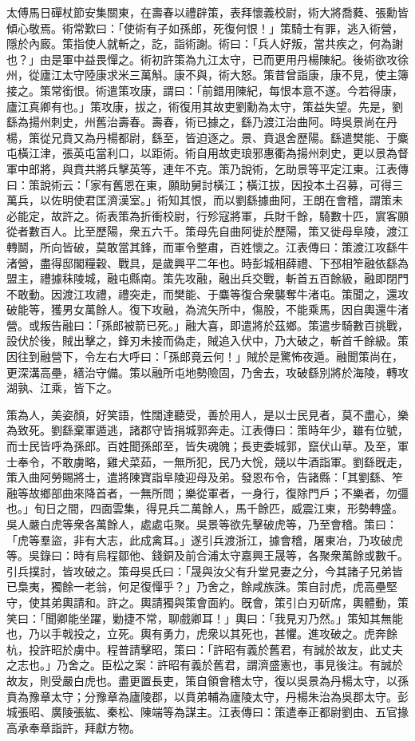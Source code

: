 \begin{pinyinscope}
太傅馬日磾杖節安集關東，在壽春以禮辟策，表拜懷義校尉，術大將喬蕤、張勳皆傾心敬焉。術常歎曰：「使術有子如孫郎，死復何恨！」策騎士有罪，逃入術營，隱於內廄。策指使人就斬之，訖，詣術謝。術曰：「兵人好叛，當共疾之，何為謝也？」由是軍中益畏憚之。術初許策為九江太守，已而更用丹楊陳紀。後術欲攻徐州，從廬江太守陸康求米三萬斛。康不與，術大怒。策昔曾詣康，康不見，使主簿接之。策常銜恨。術遣策攻康，謂曰：「前錯用陳紀，每恨本意不遂。今若得康，廬江真卿有也。」策攻康，拔之，術復用其故吏劉勳為太守，策益失望。先是，劉繇為揚州刺史，州舊治壽春。壽春，術已據之，繇乃渡江治曲阿。時吳景尚在丹楊，策從兄賁又為丹楊都尉，繇至，皆迫逐之。景、賁退舍歷陽。繇遣樊能、于麋屯橫江津，張英屯當利口，以距術。術自用故吏琅邪惠衢為揚州刺史，更以景為督軍中郎將，與賁共將兵擊英等，連年不克。策乃說術，乞助景等平定江東。江表傳曰：策說術云：「家有舊恩在東，願助舅討橫江；橫江拔，因投本土召募，可得三萬兵，以佐明使君匡濟漢室。」術知其恨，而以劉繇據曲阿，王朗在會稽，謂策未必能定，故許之。術表策為折衝校尉，行殄寇將軍，兵財千餘，騎數十匹，賔客願從者數百人。比至歷陽，衆五六千。策母先自曲阿徙於歷陽，策又徙母阜陵，渡江轉鬬，所向皆破，莫敢當其鋒，而軍令整肅，百姓懷之。江表傳曰：策渡江攻繇牛渚營，盡得邸閣糧穀、戰具，是歲興平二年也。時彭城相薛禮、下邳相笮融依繇為盟主，禮據秣陵城，融屯縣南。策先攻融，融出兵交戰，斬首五百餘級，融即閉門不敢動。因渡江攻禮，禮突走，而樊能、于麋等復合衆襲奪牛渚屯。策聞之，還攻破能等，獲男女萬餘人。復下攻融，為流矢所中，傷股，不能乘馬，因自輿還牛渚營。或叛告融曰：「孫郎被箭已死。」融大喜，即遣將於茲鄉。策遣步騎數百挑戰，設伏於後，賊出擊之，鋒刃未接而偽走，賊追入伏中，乃大破之，斬首千餘級。策因往到融營下，令左右大呼曰：「孫郎竟云何！」賊於是驚怖夜遁。融聞策尚在，更深溝高壘，繕治守備。策以融所屯地勢險固，乃舍去，攻破繇別將於海陵，轉攻湖孰、江乘，皆下之。

策為人，美姿顏，好笑語，性闊達聽受，善於用人，是以士民見者，莫不盡心，樂為致死。劉繇棄軍遁逃，諸郡守皆捐城郭奔走。江表傳曰：策時年少，雖有位號，而士民皆呼為孫郎。百姓聞孫郎至，皆失魂魄；長吏委城郭，竄伏山草。及至，軍士奉令，不敢虜略，雞犬菜茹，一無所犯，民乃大恱，競以牛酒詣軍。劉繇旣走，策入曲阿勞賜將士，遣將陳寶詣阜陵迎母及弟。發恩布令，告諸縣：「其劉繇、笮融等故鄉部曲來降首者，一無所問；樂從軍者，一身行，復除門戶；不樂者，勿彊也。」旬日之間，四面雲集，得見兵二萬餘人，馬千餘匹，威震江東，形勢轉盛。吳人嚴白虎等衆各萬餘人，處處屯聚。吳景等欲先擊破虎等，乃至會稽。策曰：「虎等羣盜，非有大志，此成禽耳。」遂引兵渡浙江，據會稽，屠東冶，乃攻破虎等。吳錄曰：時有烏程鄒他、錢銅及前合浦太守嘉興王晟等，各聚衆萬餘或數千。引兵撲討，皆攻破之。策母吳氏曰：「晟與汝父有升堂見妻之分，今其諸子兄弟皆已梟夷，獨餘一老翁，何足復憚乎？」乃舍之，餘咸族誅。策自討虎，虎高壘堅守，使其弟輿請和。許之。輿請獨與策會面約。旣會，策引白刃斫席，輿體動，策笑曰：「聞卿能坐躍，勦捷不常，聊戲卿耳！」輿曰：「我見刃乃然。」策知其無能也，乃以手戟投之，立死。輿有勇力，虎衆以其死也，甚懼。進攻破之。虎奔餘杭，投許昭於虜中。程普請擊昭，策曰：「許昭有義於舊君，有誠於故友，此丈夫之志也。」乃舍之。臣松之案：許昭有義於舊君，謂濟盛憲也，事見後注。有誠於故友，則受嚴白虎也。盡更置長吏，策自領會稽太守，復以吳景為丹楊太守，以孫賁為豫章太守；分豫章為廬陵郡，以賁弟輔為廬陵太守，丹楊朱治為吳郡太守。彭城張昭、廣陵張紘、秦松、陳端等為謀主。江表傳曰：策遣奉正都尉劉由、五官掾高承奉章詣許，拜獻方物。


\end{pinyinscope}
